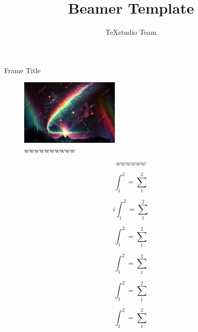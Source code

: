 \documentclass[professionalfont, aspectratio=169]{beamer}
\title{Beamer Template}
\author{TeXstudio Team}
\begin{document}
\begin{frame}[plain]
	\maketitle
\end{frame}
\begin{frame}{Frame Title}
	\begin{figure}[ht!]
		\centering
		\includegraphics{screenshot001}
		\caption{wwwwwwwwww}
		\label{fig:www}
	\end{figure}
	\begin{equation}
		wwwwww
		\label{www}
	\end{equation}
\end{frame}


\begin{frame}
	\begin{equation}\label{key}
		\int_{1}^{2}=\sum_{1}^{2} 
	\end{equation}
\end{frame}
\begin{frame}
	\begin{equation}\label{key}
		i	\int_{1}^{2}=\sum_{1}^{2}
	\end{equation}
\end{frame}
\begin{frame}
	\begin{equation}\label{key}
		\int_{1}^{2}=\sum_{1}^{2}
	\end{equation}
\end{frame}
\begin{frame}
	\begin{equation}\label{key}
		\int_{1}^{2}=\sum_{1}^{2}
	\end{equation}
\end{frame}
\begin{frame}
	\begin{equation}\label{key}
		\int_{1}^{2}=\sum_{1}^{2}
	\end{equation}
\end{frame}
\begin{frame}
	\begin{equation}\label{key}
		\int_{1}^{2}=\sum_{1}^{2}
	\end{equation}
\end{frame}
\end{document}

